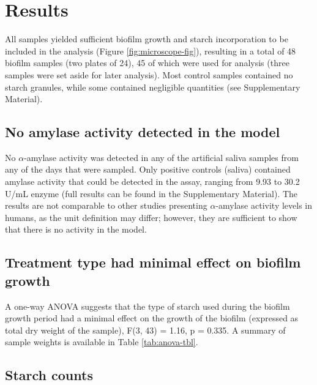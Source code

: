 \documentclass[utf8]{frontiers/frontiersSCNS}
\begin{document}
\hypertarget{results}{%
\section{Results}\label{results}}

All samples yielded sufficient biofilm growth and starch incorporation to be
included in the analysis (Figure \ref{fig:microscope-fig}), resulting in a total of 48 biofilm samples (two plates of 24),
45 of which were used for analysis (three samples were set aside for later
analysis).
Most control samples contained no starch granules, while some contained negligible
quantities (see Supplementary Material).

\hypertarget{no-amylase-activity-detected-in-the-model}{%
\subsection{No amylase activity detected in the model}\label{no-amylase-activity-detected-in-the-model}}

No \(\alpha\)-amylase activity was detected in any of the artificial
saliva samples from any of the days that were sampled. Only positive controls
(saliva)
contained amylase activity that could be detected in the assay, ranging from
9.93 to 30.2 U/mL enzyme
(full results can be found in the Supplementary Material).
The results are not comparable to other studies presenting \(\alpha\)-amylase activity
levels in humans, as the unit definition may differ;
however, they are sufficient to show that there is no activity in the model.

\hypertarget{treatment-type-had-minimal-effect-on-biofilm-growth}{%
\subsection{Treatment type had minimal effect on biofilm growth}\label{treatment-type-had-minimal-effect-on-biofilm-growth}}

A one-way ANOVA suggests that the type of starch used during the biofilm
growth period had a minimal effect on the growth of the biofilm
(expressed as total dry weight of the sample), F(3, 43)
= 1.16, p = 0.335.
A summary of sample weights is available in Table \ref{tab:anova-tbl}.

\hypertarget{starch-counts}{%
\subsection{Starch counts}\label{starch-counts}}
\end{document}
